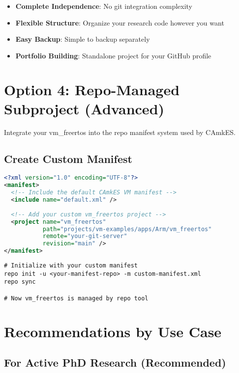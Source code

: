 \documentclass[11pt,a4paper]{article}
\begin{document}
\begin{itemize}
\item \textbf{Complete Independence}: No git integration complexity
\item \textbf{Flexible Structure}: Organize your research code however you want
\item \textbf{Easy Backup}: Simple to backup separately
\item \textbf{Portfolio Building}: Standalone project for your GitHub profile
\end{itemize}

\section{Option 4: Repo-Managed Subproject (Advanced)}

Integrate your vm\_freertos into the repo manifest system used by CAmkES.

\subsection{Create Custom Manifest}

\begin{lstlisting}[language=xml, caption=Custom Manifest (custom-manifest.xml)]
<?xml version="1.0" encoding="UTF-8"?>
<manifest>
  <!-- Include the default CAmkES VM manifest -->
  <include name="default.xml" />
  
  <!-- Add your custom vm_freertos project -->
  <project name="vm_freertos" 
           path="projects/vm-examples/apps/Arm/vm_freertos" 
           remote="your-git-server"
           revision="main" />
</manifest>
\end{lstlisting}

\begin{lstlisting}[caption=Using Custom Manifest]
# Initialize with your custom manifest
repo init -u <your-manifest-repo> -m custom-manifest.xml
repo sync

# Now vm_freertos is managed by repo tool
\end{lstlisting}

\section{Recommendations by Use Case}

\subsection{For Active PhD Research (Recommended)}
\end{document}
